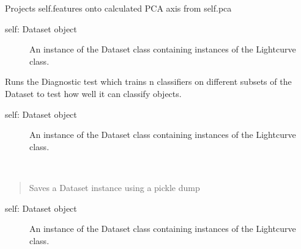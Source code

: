 \documentclass[a4paper,10pt,english]{sphinxmanual}
\begin{document}
\begin{fulllineitems}
\begin{fulllineitems}
\end{fulllineitems}


\begin{fulllineitems}
\label{\detokenize{api:malt.Dataset.project_pca}}
Projects self.features onto  calculated PCA axis from self.pca
\begin{description}
\item[{self: Dataset object}] \leavevmode
An instance of the Dataset class containing instances of the
Lightcurve class.

\end{description}

\end{fulllineitems}


\begin{fulllineitems}
\label{\detokenize{api:malt.Dataset.run_diagnostic}}
Runs the Diagnostic test which trains n classifiers on different subsets
of the Dataset to test how well it can classify objects.
\begin{description}
\item[{self: Dataset object}] \leavevmode
An instance of the Dataset class containing instances of the
Lightcurve class.

\end{description}

\end{fulllineitems}


\begin{fulllineitems}
\label{\detokenize{api:malt.Dataset.save}}~\begin{quote}

Saves a Dataset instance using a pickle dump
\end{quote}
\begin{description}
\item[{self: Dataset object}] \leavevmode
An instance of the Dataset class containing instances of the
Lightcurve class.


\end{description}
\end{fulllineitems}
\end{fulllineitems}
\end{document}

